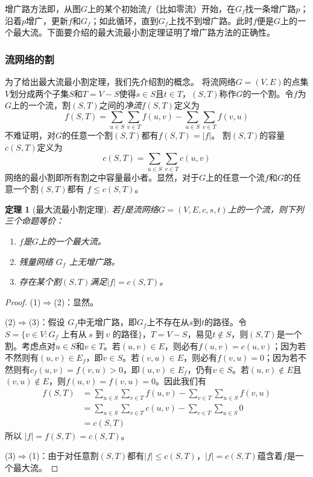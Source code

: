 \documentclass{ctexbook}
\newtheorem{theorem}{定理}
\begin{document}
    增广路方法即，从图$G$上的某个初始流$f$（比如零流）开始，在$G_f$找一条增广路$p$；沿着$p$增广，更新$f$和$G_f$；如此循环，直到$G_f$上找不到增广路。此时$f$便是$G$上的一个最大流。下面要介绍的最大流最小割定理证明了增广路方法的正确性。
    \subsubsection*{流网络的割}
    为了给出最大流最小割定理，我们先介绍割的概念。
    将流网络$G=(V,E)$的点集$V$划分成两个子集$S$和$T=V-S$使得$s\in S$且$t\in T$，$(S,T)$称作$G$的一个割。令$f$为$G$上的一个流，割$(S,T)$之间的\emph{净流}$f(S,T)$定义为
    \[
    f(S,T) = \sum_{u\in S}\sum_{v\in T}f(u,v) - \sum_{u\in S}\sum_{v\in T}f(v,u)
    \]
    不难证明，对$G$的任意一个割$(S,T)$都有$f(S,T) = |f|$。
    割$(S,T)$的容量$c(S,T)$定义为
    \[
    c(S,T) = \sum_{u\in S}\sum_{v\in T}c(u,v)
    \]
    网络的最小割即所有割之中容量最小者。显然，对于$G$上的任意一个流$f$和$G$的任意一个割$(S,T)$都有 $f \le c(S,T)$。
    \begin{theorem}[最大流最小割定理]
        若$f$是流网络$G=(V,E,c,s,t)$上的一个流，则下列三个命题等价：
        \begin{enumerate}
            \item $f$是$G$上的一个最大流。
            \item 残量网络 $G_f$ 上无增广路。
            \item 存在某个割$(S,T)$满足$|f| = c(S,T)$。
        \end{enumerate}
    \end{theorem}
    \begin{proof}
        (1)$\Rightarrow$(2)：显然。

        (2)$\Rightarrow$(3)：假设 $G_f$中无增广路，即$G_f$上不存在从$s$到$t$的路径。令$S=\{v\in V\colon G_f\text{ 上有从}\ s\text{ 到}\ v\text{ 的路径}\}$，$T=V-S$，易见$t\notin S$，则$(S,T)$是一个割。考虑点对$u\in S$和$v\in T$。若$(u,v)\in E$，则必有$f(u,v)=c(u,v)$；因为若不然则有$(u,v)\in E_f$，即$v\in S$。若$(v,u)\in E$，则必有$f(v,u)=0$；因为若不然则有$c_f(u,v) = f(v,u) > 0$，即$(u,v)\in E_f$，仍有$v \in S$。若$(u,v)\notin E$且$(v,u)\notin E$，则$f(u,v)=f(v,u)=0$。因此我们有
        \begin{align*}
            f(S,T) &= \sum_{u\in S}\sum_{v\in T}f(u,v) - \sum_{v\in T}\sum_{u\in S}f(v,u)\\
            &= \sum_{u\in S}\sum_{v\in T}c(u,v) - \sum_{v\in T}\sum_{u\in S}0\\
            &= c(S, T)
        \end{align*}
        所以 $|f| = f(S,T) = c(S, T)$。

        (3)$\Rightarrow$(1)：由于对任意割$(S,T)$都有$|f|\le c(S,T)$，$|f|=c(S,T)$蕴含着$f$是一个最大流。
    \end{proof}
\end{document}
